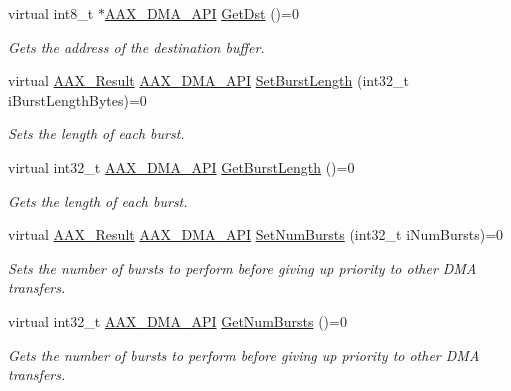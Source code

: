 \begin{Indent}
\begin{DoxyCompactItemize}
virtual int8\+\_\+t $\ast$\mbox{\hyperlink{a00587_acae60d01e5e4bd3282369d0d9d378f3f}{A\+A\+X\+\_\+\+D\+M\+A\+\_\+\+A\+PI}} \mbox{\hyperlink{a01809_a19544dc2ec903f8e80d80db846ea8af0}{Get\+Dst}} ()=0
\begin{DoxyCompactList}\small\item\em Gets the address of the destination buffer. \end{DoxyCompactList}\item 
virtual \mbox{\hyperlink{a00392_a4d8f69a697df7f70c3a8e9b8ee130d2f}{A\+A\+X\+\_\+\+Result}} \mbox{\hyperlink{a00587_acae60d01e5e4bd3282369d0d9d378f3f}{A\+A\+X\+\_\+\+D\+M\+A\+\_\+\+A\+PI}} \mbox{\hyperlink{a01809_ac85fdea20b072cbdc258aa398d02fa92}{Set\+Burst\+Length}} (int32\+\_\+t i\+Burst\+Length\+Bytes)=0
\begin{DoxyCompactList}\small\item\em Sets the length of each burst. \end{DoxyCompactList}\item 
virtual int32\+\_\+t \mbox{\hyperlink{a00587_acae60d01e5e4bd3282369d0d9d378f3f}{A\+A\+X\+\_\+\+D\+M\+A\+\_\+\+A\+PI}} \mbox{\hyperlink{a01809_ac4ded104803ed34131be6924d591f0e6}{Get\+Burst\+Length}} ()=0
\begin{DoxyCompactList}\small\item\em Gets the length of each burst. \end{DoxyCompactList}\item 
virtual \mbox{\hyperlink{a00392_a4d8f69a697df7f70c3a8e9b8ee130d2f}{A\+A\+X\+\_\+\+Result}} \mbox{\hyperlink{a00587_acae60d01e5e4bd3282369d0d9d378f3f}{A\+A\+X\+\_\+\+D\+M\+A\+\_\+\+A\+PI}} \mbox{\hyperlink{a01809_a174fc7382d7f587252f4a9e557830b91}{Set\+Num\+Bursts}} (int32\+\_\+t i\+Num\+Bursts)=0
\begin{DoxyCompactList}\small\item\em Sets the number of bursts to perform before giving up priority to other D\+MA transfers. \end{DoxyCompactList}\item 
virtual int32\+\_\+t \mbox{\hyperlink{a00587_acae60d01e5e4bd3282369d0d9d378f3f}{A\+A\+X\+\_\+\+D\+M\+A\+\_\+\+A\+PI}} \mbox{\hyperlink{a01809_ae8a335f5230a5f7face87f9efb7c8aaf}{Get\+Num\+Bursts}} ()=0
\begin{DoxyCompactList}\small\item\em Gets the number of bursts to perform before giving up priority to other D\+MA transfers. \end{DoxyCompactList}\item 

\end{DoxyCompactItemize}
\end{Indent}
